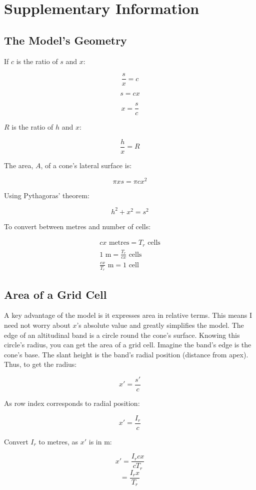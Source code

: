 \documentclass[11pt]{article}
\begin{document}
\newpage

{}

\newpage
\appendix
\section*{Supplementary Information}
\subsection*{The Model's Geometry}
If $c$ is the ratio of $s$ and $x$:

$$\frac{s}{x} = c$$

$$s = cx$$

$$x = \frac{s}{c}$$

$R$ is the ratio of $h$ and $x$:

$$\frac{h}{x} = R$$

The area, $A$, of a cone's lateral surface is:

$$\pi xs = \pi cx^2$$

Using Pythagoras' theorem:

$$h^2 + x^2 = s^2$$

To convert between metres and number of cells:

\begin{align}
cx \text{ metres} = T_r \text{ cells} \\
1 \text{ m} = \frac{T_r}{cx} \text{ cells} \\
\frac{cx}{T_r} \text{ m} = 1 \text{ cell}
\end{align}

\subsection*{Area of a Grid Cell}
A key advantage of the model is it expresses area in relative terms. This means I need not worry about $x$'s absolute value and greatly simplifies the model. The edge of an altitudinal band is a circle round the cone's surface. Knowing this circle's radius, you can get the area of a grid cell. Imagine the band's edge is the cone's base. The slant height is the band's radial position (distance from apex). Thus, to get the radius:

$$x' = \frac{s'}{c}$$

As row index corresponds to radial position:

$$x' = \frac{I_r}{c}$$

Convert $I_r$ to metres, as $x'$ is in m:

$$x' = \frac{I_r cx}{c T_r}$$
$$= \frac{I_r x}{T_r}$$
\end{document}

